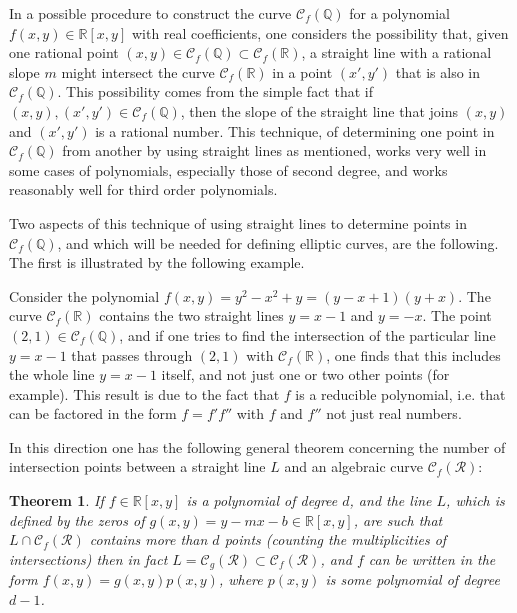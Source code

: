 \documentclass[12pt,letterpaper]{book}
\newtheorem{theorem}{Theorem}
\begin{document}
In a possible procedure to construct the curve $\mathscr{C}_f(\mathbb{Q})$ for a polynomial $f(x,y)\in\mathbb{R}[x,y]$
with real coefficients, one considers the possibility that, given one rational point
$(x,y)\in\mathscr{C}_f(\mathbb{Q})\subset\mathscr{C}_f(\mathbb{R})$, a straight line with a rational slope $m$
might intersect the curve $\mathscr{C}_f(\mathbb{R})$ in a point $(x',y')$ that is also in $\mathscr{C}_f(\mathbb{Q})$.
This possibility comes from the simple fact that if $(x,y), (x',y')\in\mathscr{C}_f(\mathbb{Q})$, then the slope of the
straight line that joins $(x,y)$ and $(x',y')$ is a rational number. This technique, of determining one point in
$\mathscr{C}_f(\mathbb{Q})$ from another by using straight lines as mentioned, works very well in some cases of
polynomials, especially those of second degree, and works reasonably well for third order polynomials.

Two aspects of this technique of using straight lines to determine points in $\mathscr{C}_f(\mathbb{Q})$,
and which will be needed for defining elliptic curves, are the following. The first is illustrated by the
following example.

Consider the polynomial $f(x,y)=y^2-x^2+y=(y-x+1)(y+x)$. The curve
$\mathscr{C}_f(\mathbb{R})$ contains the two straight lines $y=x-1$
and $y=-x$. The point $(2,1)\in\mathscr{C}_f(\mathbb{Q})$, and if
one tries to find the intersection of the particular line $y=x-1$
that passes through $(2,1)$ with $\mathscr{C}_f(\mathbb{R})$, one
finds that this includes the whole line $y=x-1$ itself, and not just
one or two other points (for example). This result is due to the
fact that $f$ is a reducible polynomial, i.e. that can be factored
in the form $f=f'f''$ with $f$ and $f''$ not just real numbers.

In this direction one has the following general theorem concerning the number of intersection points between a straight
line $L$ and an algebraic curve $\mathscr{C}_f(\mathcal{R})$:

\begin{theorem}
If $f\in\mathbb{R}[x,y]$ is a polynomial of degree $d$, and the line $L$, which is defined by the zeros of
 $g(x,y)=y-mx-b\in\mathbb{R}[x,y]$, are such that $L\cap\mathscr{C}_f(\mathcal{R})$ contains more than $d$ points
 (counting the multiplicities of intersections) then in fact
 $L=\mathscr{C}_g(\mathcal{R})\subset\mathscr{C}_f(\mathcal{R})$, and $f$ can be written in the form
 $f(x,y)=g(x,y)p(x,y)$, where $p(x,y)$ is some polynomial of degree $d-1$.
\end{theorem}
\end{document}
